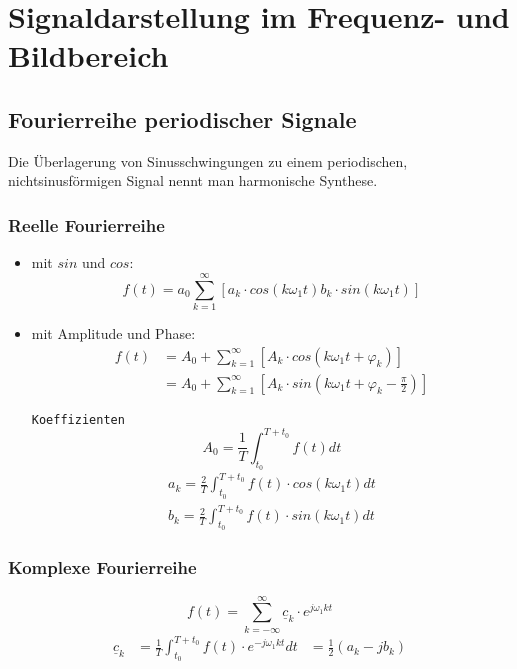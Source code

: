 \section{Signaldarstellung im Frequenz- und Bildbereich}
\subsection{Fourierreihe periodischer Signale}
Die Überlagerung von Sinusschwingungen zu einem periodischen,
nichtsinusförmigen Signal nennt man harmonische Synthese.
\subsubsection{Reelle Fourierreihe}
\begin{mdframed}[style=exercise]
	\begin{itemize}
		\item mit $sin$ und $cos$:
		      \[
			      f(t) = a_0 \sum_{k=1}^\infty [a_k\cdot cos(k\omega_1 t) b_k\cdot sin(k\omega_1 t)]
		      \]
		\item mit Amplitude und Phase:
		      \begin{align*}
			      f(t) & = A_0+\sum_{k=1}^\infty [A_k\cdot cos(k\omega_1 t + \varphi_k)]               \\
			           & = A_0+\sum_{k=1}^\infty [A_k\cdot sin(k\omega_1 t + \varphi_k-\frac{\pi}{2})]
		      \end{align*}

		      \texttt{\footnotesize Koeffizienten }
		      \[
			      A_0 = \frac{1}{T}\int_{t_0}^{T+t_0} f(t)dt
		      \]
		      \begin{align*}
			      a_k = \frac{2}{T}\int_{t_0}^{T+t_0} f(t)\cdot cos(k\omega_1 t) dt \\
			      b_k = \frac{2}{T}\int_{t_0}^{T+t_0} f(t)\cdot sin(k\omega_1 t) dt
		      \end{align*}
	\end{itemize}
\end{mdframed}

\subsubsection{Komplexe Fourierreihe}
\begin{mdframed}[style=exercise]
	\[
		f(t)=\sum_{k=-\infty}^{\infty} \underline{c}_k\cdot e^{j\omega_1 k t}
	\]
	\begin{align*}
		\underline{c}_k & = \frac{1}{T}\int_{t_0}^{T+t_0} f(t)\cdot e^{-j\omega_1 k t}dt
		                & = \frac{1}{2}\left( a_k-jb_k \right)
	\end{align*}
\end{mdframed}

